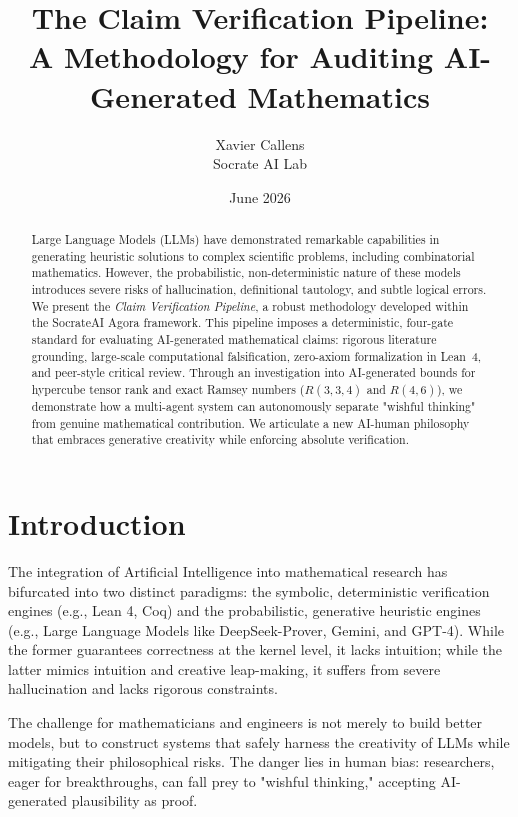 \documentclass[11pt,a4paper]{article}
\title{The Claim Verification Pipeline: \\ A Methodology for Auditing AI-Generated Mathematics}
\author{Xavier Callens \\ Socrate AI Lab}
\date{June 2026}
\begin{document}
\maketitle

\begin{abstract}
Large Language Models (LLMs) have demonstrated remarkable capabilities in generating heuristic solutions to complex scientific problems, including combinatorial mathematics. However, the probabilistic, non-deterministic nature of these models introduces severe risks of hallucination, definitional tautology, and subtle logical errors. We present the \textit{Claim Verification Pipeline}, a robust methodology developed within the SocrateAI Agora framework. This pipeline imposes a deterministic, four-gate standard for evaluating AI-generated mathematical claims: rigorous literature grounding, large-scale computational falsification, zero-axiom formalization in Lean~4, and peer-style critical review. Through an investigation into AI-generated bounds for hypercube tensor rank and exact Ramsey numbers ($R(3,3,4)$ and $R(4,6)$), we demonstrate how a multi-agent system can autonomously separate "wishful thinking" from genuine mathematical contribution. We articulate a new AI-human philosophy that embraces generative creativity while enforcing absolute verification.
\end{abstract}

\section{Introduction}

The integration of Artificial Intelligence into mathematical research has bifurcated into two distinct paradigms: the symbolic, deterministic verification engines (e.g., Lean 4, Coq) and the probabilistic, generative heuristic engines (e.g., Large Language Models like DeepSeek-Prover, Gemini, and GPT-4). While the former guarantees correctness at the kernel level, it lacks intuition; while the latter mimics intuition and creative leap-making, it suffers from severe hallucination and lacks rigorous constraints.

The challenge for mathematicians and engineers is not merely to build better models, but to construct systems that safely harness the creativity of LLMs while mitigating their philosophical risks. The danger lies in human bias: researchers, eager for breakthroughs, can fall prey to "wishful thinking," accepting AI-generated plausibility as proof.
\end{document}
